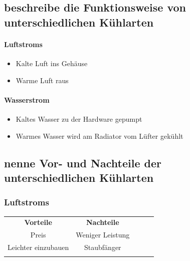 \documentclass[a4paper]{article}
\begin{document}
    \subsection{\color{red}beschreibe die Funktionsweise von unterschiedlichen Kühlarten}\label{subsec:color{red}beschreibe-die-funktionsweise-von-unterschiedlichen-kühlarten}

    \paragraph{\color{codegreen}Luftstroms}
    \begin{itemize}
        \color{magenta}
        \item Kalte Luft ins Gehäuse
        \item Warme Luft raus
    \end{itemize}

    \paragraph{\color{codegreen}Wasserstrom}
    \begin{itemize}
        \color{magenta}
        \item  Kaltes Wasser zu der Hardware gepumpt
        \item Warmes Wasser wird am Radiator vom Lüfter gekühlt
    \end{itemize}

    \subsection{\color{red}nenne Vor- und Nachteile der unterschiedlichen Kühlarten}\label{subsec:color{red}nenne-vor--und-nachteile-der-unterschiedlichen-kühlarten}

    \subsubsection{\color{codegreen}Luftstroms}
    \begin{center}
        \begin{tabular}{cclll}
            \cline{1-2}
            \multicolumn{1}{|c|}{\textbf{Vorteile}}                          & \multicolumn{1}{c|}{\textbf{Nachteile}}                      &  &  &  \\ \cline{1-2}
            \multicolumn{1}{|c|}{{\color[HTML]{32CB00} Preis}}               & \multicolumn{1}{c|}{{\color[HTML]{F56B00} Weniger Leistung}} &  &  &  \\ \cline{1-2}
            \multicolumn{1}{|c|}{{\color[HTML]{32CB00} Leichter einzubauen}} & \multicolumn{1}{c|}{{\color[HTML]{F56B00} Staubfänger}}      &  &  &  \\ \cline{1-2}
            \multicolumn{1}{l}{}                                             & \multicolumn{1}{l}{}                                         & & &
        \end{tabular}
    \end{center}
\end{document}
